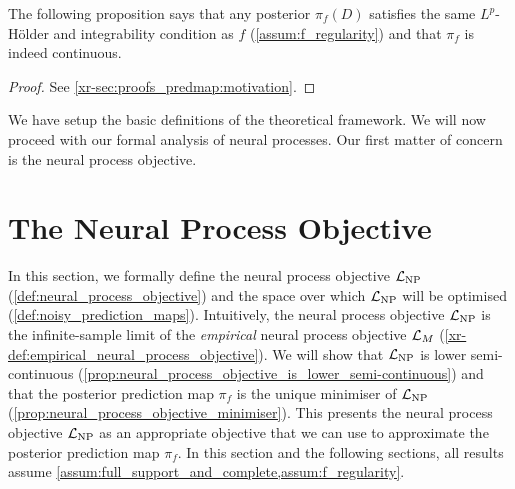 \documentclass[12pt, twoside]{report}
\newcommand{\xrprefix}[1]{xr-#1}
\begin{document}
The following proposition says that any posterior $\pi_f(D)$ satisfies the same $L^p$-H\"older and integrability condition as $f$ (\cref{assum:f_regularity}) and that $\pi_f$ is indeed continuous.

\begin{proof}
    See \cref{\xrprefix{sec:proofs_predmap:motivation}}.
\end{proof}


We have setup the basic definitions of the theoretical framework.
We will now proceed with our formal analysis of neural processes.
Our first matter of concern is the neural process objective.

\section{The Neural Process Objective}
\label{sec:predmap:neural_process_objective}

In this section, we formally define the neural process objective $\L\ss{NP}$ (\cref{def:neural_process_objective}) and the space over which $\L\ss{NP}$ will be optimised (\cref{def:noisy_prediction_maps}).
Intuitively, the neural process objective $\L\ss{NP}$ is the infinite-sample limit of the \emph{empirical} neural process objective $\mathcal{L}_M$ (\cref{\xrprefix{def:empirical_neural_process_objective}}).
We will show that $\L\ss{NP}$ is lower semi-continuous (\cref{prop:neural_process_objective_is_lower_semi-continuous}) and that the posterior prediction map $\pi_f$ is the unique minimiser of $\L\ss{NP}$ (\cref{prop:neural_process_objective_minimiser}).
This presents the neural process objective $\L\ss{NP}$ as an appropriate objective that we can use to approximate the posterior prediction map $\pi_f$.
In this section and the following sections, all results assume \cref{assum:full_support_and_complete,assum:f_regularity}.
\end{document}
